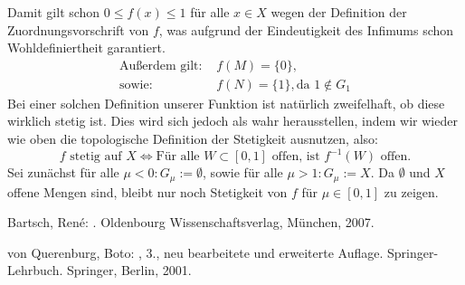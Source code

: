 \documentclass[11pt,leqno]{article}
\begin{document}
Damit gilt schon $0 \leq f(x) \leq 1$ für alle $x \in X$ wegen der Definition der Zuordnungsvorschrift von $f$, was aufgrund der Eindeutigkeit des
Infimums schon Wohldefiniertheit garantiert.
\begin{align*}
    \text{Außerdem gilt: } & f(M) = \{0\}, \\
    \text{sowie: } &         f(N) = \{1\}, \text{da } 1 \notin G_1 
\end{align*}
Bei einer solchen Definition unserer Funktion ist natürlich zweifelhaft, ob diese wirklich stetig ist. Dies wird sich jedoch als wahr herausstellen,
indem wir wieder wie oben die topologische Definition der Stetigkeit ausnutzen, also:
\[f \text{ stetig auf } X \Leftrightarrow \text{Für alle } W \subset [0,1] \text { offen, ist } f^{-1}(W) \text{ offen.}\]
Sei zunächst für alle $\mu < 0: G_\mu := \emptyset$, sowie für alle $\mu > 1: G_\mu := X.$
Da $\emptyset$ und $X$ offene Mengen sind, bleibt nur noch Stetigkeit von $f$ für $\mu \in [0,1]$ zu zeigen.



\begin{thebibliography}{99}

    {\sc Bartsch, René:}
    .
    \newblock Oldenbourg Wissenschaftsverlag, München, 2007.
    
    
    {\sc von Querenburg, Boto:}
    , 3., neu bearbeitete und erweiterte Auflage.
    \newblock Springer-Lehrbuch. Springer, Berlin, 2001.
\end{thebibliography}
\end{document}
